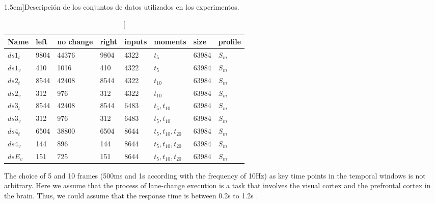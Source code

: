 \begin{table}[t]
	\caption[Resúmen de información extraída del vehículo instrumentado][1.5em]{Descripción de los conjuntos de datos utilizados en los experimentos.}
	\label{tbl:data-sets-description}
	\begin{tabular}{llllllll}
		\toprule
		Name & left & no change & right & inputs & moments & size & profile \\
		\midrule
		$ds1_t$ & 9804 & 44376 & 9804 & 4322 & $t_5$ & 63984 & $S_m$ \\
		$ds1_v$ & 410 & 1016 & 410 & 4322 & $t_5$ & 63984 & $S_m$ \\
		$ds2_t$ & 8544 & 42408 & 8544 & 4322 & $t_{10}$ & 63984 & $S_m$ \\
		$ds2_v$ & 312 & 976 & 312 & 4322 & $t_{10}$ & 63984 & $S_m$ \\
		$ds3_t$ & 8544 & 42408 & 8544 & 6483 & $t_5, t_{10}$ & 63984 & $S_m$ \\
		$ds3_v$ & 312 & 976 & 312 & 6483 & $t_5, t_{10}$ & 63984 & $S_m$ \\
		$ds4_t$ & 6504 & 38800 & 6504 & 8644 & $t_5, t_{10}, t_{20}$ & 63984 & $S_m$ \\
		$ds4_v$ & 144 & 896 & 144 & 8644 & $t_5, t_{10}, t_{20}$ & 63984 & $S_m$ \\
		$dsE_v$ & 151 & 725 & 151 & 8644 & $t_5, t_{10}, t_{20}$ & 63984 & $S_m$ \\
		\bottomrule
	\end{tabular}
\end{table}

The choice of 5 and 10 frames (500ms and 1s according with the frequency of 10Hz) as key time points in the temporal windows is not arbitrary. Here we assume that the process of lane-change execution is a task that involves the visual cortex and the prefrontal cortex in the brain. Thus, we could assume that the response time is between 0.2s to 1.2s \cite{lipton2015critical}.

